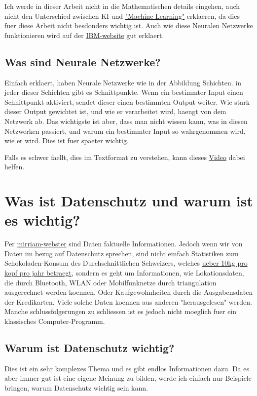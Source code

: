 \documentclass{report}
\begin{document}
Ich werde in dieser Arbeit nicht in die Mathematischen details eingehen, auch nicht den Unterschied zwischen KI und \hyperlink{https://www.ibm.com/topics/machine-learning}{"Machine Learning"} erklaeren, da dies fuer diese Arbeit nicht besdonders wichtig ist. Auch wie diese Neuralen Netzwerke funktionieren 
wird auf der \hyperlink{https://www.ibm.com/topics/neural-networks}{IBM-website} gut erklaert.
\subsection{Was sind Neurale Netzwerke?}
Einfach erklaert, haben Neurale Netzwerke wie in der Abbildung Schichten. in jeder dieser Schichten gibt es Schnittpunkte. Wenn ein bestimmter Input einen Schnittpunkt aktiviert, sendet dieser einen bestimmten Output weiter. Wie stark dieser Output gewichtet ist, und wie er verarbeitet wird, haengt von dem Netzwerk ab.
Das wichtigste ist aber, dass man nicht wissen kann, was in diesen Netzwerken passiert, und warum ein bestimmter Input so wahrgenommen wird, wie er wird. Dies ist fuer spaeter wichtig.

Falls es schwer faellt, dies im Textformat zu verstehen, kann dieses \hyperlink{https://youtube.com/watch?v=p6CfR3Wpz7Y&t=390}{Video} dabei helfen.

\section{Was ist Datenschutz und warum ist es wichtig?}
Per \hyperlink{https://www.merriam-webster.com/dictionary/data}{mirriam-webster} sind Daten faktuelle Informationen.
Jedoch wenn wir von Daten im bezug auf Datenschutz sprechen, sind nicht einfach Statistiken zum Schokoladen-Konsum des Durchschnittlichen Schweizers, welches \hyperlink{https://de.statista.com/statistik/daten/studie/369440/umfrage/pro-kopf-konsum-von-schokolade-in-der-schweiz/}{ueber 10kg pro kopf pro jahr betraegt},
sondern es geht um Informationen, wie Lokationsdaten, die durch Bluetooth, WLAN oder Mobilfunknetze durch triangulation ausgerechnet werden koennen. Oder Kaufgewohnheiten durch die Ausgabensdaten der Kredikarten.
Viele solche Daten koennen aus anderen "herausgelesen" werden. Manche schlussfolgerungen zu schliessen ist es jedoch nicht moeglich fuer ein klassisches Computer-Programm.
\subsection{Warum ist Datenschutz wichtig?}
Dies ist ein sehr komplexes Thema und es gibt endlos Informationen dazu. Da es aber immer gut ist eine eigene Meinung zu bilden, werde ich einfach nur Beispiele bringen, warum Datenschutz wichtig sein kann.
\end{document}
